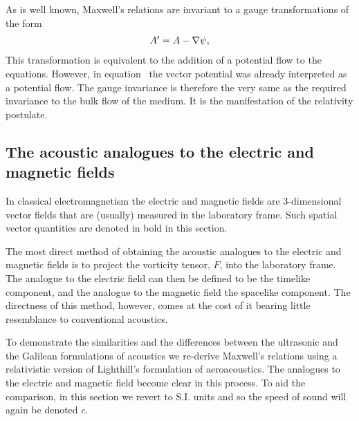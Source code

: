 As is well known, Maxwell's relations are invariant to a gauge transformations of the form
\begin{align}
A^\prime = A - \nabla \psi,
\end{align}
This transformation is equivalent to the addition of a potential flow to the equations.
However, in equation~ the vector potential was already interpreted as a potential flow.
The gauge invariance is therefore the very same as the required invariance to the bulk flow of the medium.
It is the manifestation of the \Poincare relativity postulate.






\subsection{The acoustic analogues to the electric and magnetic fields}\label{sec:int:EM}

In classical electromagnetism the electric and magnetic fields are 
3-dimensional vector fields that are (usually) measured  in the laboratory frame.
Such spatial vector quantities are denoted in bold in this section.

The most direct method of obtaining the acoustic analogues to the electric and magnetic fields
 is to project the vorticity tensor, $F$, into the laboratory  frame\cite{Hestenes2003, Doran2003}.
The analogue to the electric field can then be defined to be the timelike component, and the analogue to the magnetic field the spacelike component\cite{Hestenes2003}.
The directness of this method, however, comes at the cost of it bearing little  resemblance to conventional acoustics.

To demonstrate the similarities and the differences between  the ultrasonic and the Galilean  formulations of acoustics
we re-derive Maxwell's relations using a relativistic version of Lighthill's formulation of aeroacoustics\cite{Lighthill1952}.
The analogues to the electric and magnetic field  become clear in this process.
To aid the comparison, in this section we revert to S.I. units and so the speed of sound will again be denoted $c$.


